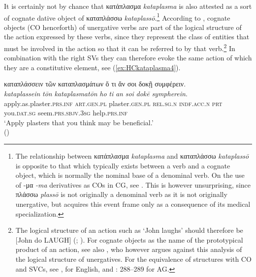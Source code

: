 \documentclass[output=paper,colorlinks,citecolor=brown]{langscibook}
\begin{document}
It is certainly not by chance that κατάπλασμα \textit{kataplasma} is also attested as a sort of cognate dative object of καταπλάσσω \textit{kataplassō}.\footnote{The relationship between κατάπλασμα \textit{kataplasma} and καταπλάσσω \textit{kataplassō} is opposite to that which typically exists between a verb and a cognate object, which is normally the nominal base of a denominal verb. On the use of -μα \textit{-ma} derivatives as COs in CG, see \citet[287]{horrocksstavrou2010}. This is however unsurprising, since πλάσσω \textit{plassō} is not originally a denominal verb as it is not originally unergative, but acquires this event frame only as a consequence of its medical specialization.} According to \citet{HaleKeyserES1987}, \citet{halekeyser1993} cognate objects (CO henceforth) of unergative verbs are part of the logical structure of the action expressed by these verbs, since they represent the class of entities that must be involved in the action so that it can be referred to by that verb.\footnote{The logical structure of an action such as ‘John laughs’ should therefore be [John do LAUGH] (\citealt[48--50]{HaleKeyserES1987}; \citealt[§ 1]{halekeyser1993}). For cognate objects as the name of the prototypical product of an action, see also \citet{Massam1990}, who however argues against this analysis of the logical structure of unergatives. For the equivalence of structures with CO and SVCs, see \citet{mirto2007dream}, for English, and \citet[288--289]{horrocksstavrou2010}: 288--289 for AG.} In combination with the right SVs they can therefore evoke the same action of which they are a constitutive element, see (\ref{ex:HCkataplasma4}).

\begin{exe}
\ex\label{ex:HCkataplasma4}
\glll καταπλάσσειν τῶν καταπλασμάτων ὅ τι ἄν σοι δοκῇ συμφέρειν. \\
\textit{kataplassein} \textit{tōn} \textit{kataplasmatōn} \textit{ho} \textit{ti} \textit{an} \textit{soi} \textit{dokē} \textit{sympherein}. \\
apply.as.plaster.\textsc{prs.inf} \textsc{art.gen.pl} plaster.\textsc{gen.pl} \textsc{rel.sg.n} \textsc{indf.acc.n} \textsc{prt} you.\textsc{dat.sg} seem.\textsc{prs.sbjv.3sg} help.\textsc{prs.inf} \\
\glt ‘Apply plasters that you think may be beneficial.' \\
\hspace*{\fill}()
\end{exe}
\end{document}
